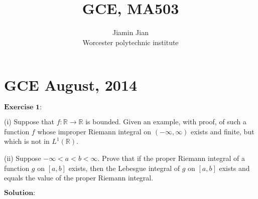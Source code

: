 \documentclass[12pt]{article}
\title{GCE, MA503}
\author{Jiamin Jian \\
Worcester polytechnic institute}
\date{}
\begin{document}
\maketitle

\section{GCE August, 2014}

$\textbf{Exercise 1:}$

(i) Suppose that $f: \mathbb{R} \to \mathbb{R}$ is bounded. Given an example, with proof, of such a function $f$ whose improper Riemann integral on $(-\infty, \infty)$ exists and finite, but which is not in $L^{1}(\mathbb{R})$.

\vspace{4pt}

(ii) Suppose $- \infty < a < b < \infty$. Prove that if the proper Riemann integral of a function $g$ on $[a, b]$ exists, then the Lebesgue integral of $g$ on $[a, b]$ exists and equals the value of the proper Riemann integral.

\vspace{8pt}

$\textbf{Solution:}$
\end{document}
